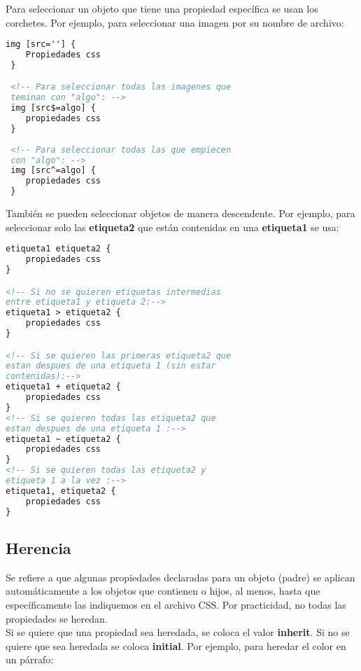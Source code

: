 \documentclass[10pt,oneside]{article}
\begin{document}
\begin{multicols}{2}
    Para seleccionar un objeto que tiene una propiedad específica se usan los corchetes. Por ejemplo, para seleccionar una imagen por su nombre de archivo:

    \begin{lstlisting}[language=HTML]
 img [src=''] {
    Propiedades css
 }

 <!-- Para seleccionar todas las imagenes que 
 teminan con "algo": -->
 img [src$=algo] {
    propiedades css
 }
 
 <!-- Para seleccionar todas las que empiecen
 con "algo": -->
 img [src^=algo] {
    propiedades css
 }
    \end{lstlisting}

    También se pueden seleccionar objetos de manera descendente. Por ejemplo, para seleccionar solo las \textbf{etiqueta2} que están contenidas en una \textbf{etiqueta1} se usa:

    \begin{lstlisting}[language=HTML]
etiqueta1 etiqueta2 {
    propiedades css
}

<!-- Si no se quieren etiquetas intermedias 
entre etiqueta1 y etiqueta 2:-->
etiqueta1 > etiqueta2 {
    propiedades css
}

<!-- Si se quieren las primeras etiqueta2 que 
estan despues de una etiqueta 1 (sin estar
contenidas):-->
etiqueta1 + etiqueta2 {
    propiedades css
}
<!-- Si se quieren todas las etiqueta2 que 
estan despues de una etiqueta 1 :-->
etiqueta1 ~ etiqueta2 {
    propiedades css
}
<!-- Si se quieren todas las etiqueta2 y
etiqueta 1 a la vez :-->
etiqueta1, etiqueta2 {
    propiedades css
}

    \end{lstlisting}

\subsection{Herencia} 

    Se refiere a que algunas propiedades declaradas para un objeto (padre) se aplican automáticamente a los objetos que contienen o hijos, al menos, hasta que específicamente las indiquemos en el archivo CSS. Por practicidad, no todas las propiedades se heredan.\\ \newline Si se quiere que una propiedad sea heredada, se coloca el valor \textbf{inherit}. Si no se quiere que sea heredada se coloca \textbf{initial}. Por ejemplo, para heredar el color en un párrafo:


\end{multicols}
\end{document}
